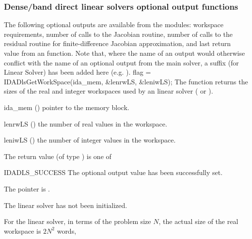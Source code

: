 {\subsubsection{Dense/band direct linear solvers optional output functions}
\label{sss:optout_dls}
The following optional outputs are available from the {\idadls} modules:
workspace requirements, number of calls to the Jacobian routine, number of 
calls to the residual routine for finite-difference Jacobian approximation,
and last return value from an {\idadls} function.
Note that, where the name of an output would otherwise conflict with
the name of an optional output from the main solver, a suffix 
(for Linear Solver) has been added here (e.g.  ).
{
  flag = IDADlsGetWorkSpace(ida\_mem, \&lenrwLS, \&leniwLS);
}
{
  The function  returns the sizes of the real and
  integer workspaces used by an {\idadls} linear solver ({\idadense} or
  {\idaband}). 
}
{
  \begin{args}
  \item[ida\_mem] ()
    pointer to the {\ida} memory block.
  \item[lenrwLS] ()
    the number of real values in the {\idadls} workspace.
  \item[leniwLS] ()
    the number of integer values in the {\idadls} workspace.
  \end{args}
}
{
  The return value  (of type ) is one of
  \begin{args}
  \item[IDADLS\_SUCCESS] 
    The optional output value has been successfully set.
  \item[\Id{IDADLS\_MEM\_NULL}]
    The  pointer is .
  \item[\Id{IDADLS\_LMEM\_NULL}]
    The {\idadls} linear solver has not been initialized.
  \end{args}
}
{
  For the {\idadense} linear solver, in terms of the problem size $N$,
  the actual size of the real workspace is $2N^2$  words,
}}
